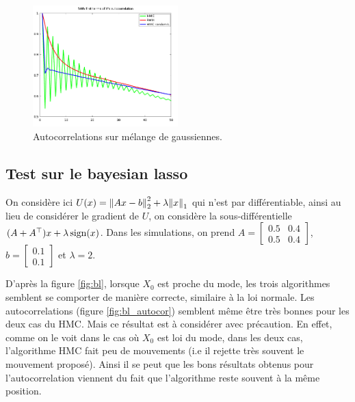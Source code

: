 \documentclass[10pt,a4paper]{article}
\begin{document}
\begin{figure}[ht]
  \centering
  \includegraphics[width=0.5\textwidth]{figs/gm_autocor.png}
  \caption{Autocorrelations sur mélange de gaussiennes. \label{fig:gm_autocor}}
\end{figure}

\subsection{Test sur le bayesian lasso}
On considère ici $U(x) = { \left\| Ax - b \right\|}_2^2 + \lambda { \left\| x \right\|}_1$ qui n'est par différentiable, ainsi au lieu de considérer le gradient de $U$, on considère la sous-différentielle $(A + A^\top) x + \lambda \operatorname{sign}(x)$. Dans les simulations, on prend $A = \begin{bmatrix} 0.5 & 0.4 \\ 0.5 & 0.4 \end{bmatrix}$, $b = \begin{bmatrix} 0.1 \\ 0.1 \end{bmatrix}$ et $\lambda = 2$.

D'après la figure \ref{fig:bl}, lorsque $X_0$ est proche du mode, les trois algorithmes semblent se comporter de manière correcte, similaire à la loi normale. Les autocorrelations (figure \ref{fig:bl_autocor}) semblent même être très bonnes pour les deux cas du HMC. Mais ce résultat est à considérer avec précaution. En effet, comme on le voit dans le cas où $X_0$ est loi du mode, dans les deux cas, l'algorithme HMC fait peu de mouvements (i.e il rejette très souvent le mouvement proposé). Ainsi il se peut que les bons résultats obtenus pour l'autocorrelation viennent du fait que l'algorithme reste souvent à la même position. 
\end{document}
